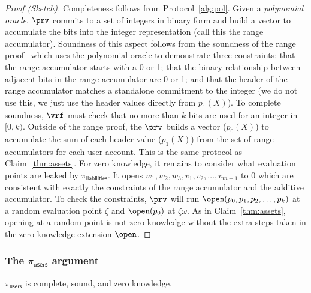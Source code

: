 \begin{proof}[Proof (Sketch)] Completeness follows from Protocol~\ref{alg:pol}. Given a \textit{polynomial oracle}, $\prv$ commits to a set of integers in binary form and build a vector to accumulate the bits into the integer representation (call this the range accumulator). Soundness of this aspect follows from the soundness of the range proof~\cite{rangeproof} which uses the polynomial oracle to demonstrate three constraints: that the range accumulator starts with a 0 or 1; that the binary relationship between adjacent bits in the range accumulator are 0 or 1; and that the header of the range accumulator matches a standalone commitment to the integer (we do not use this, we just use the header values directly from $p_1(X)$). To complete soundness, $\vrf$ must check that no more than $k$ bits are used for an integer in $[0,k)$. Outside of the range proof, the $\prv$ builds a vector ($p_0(X)$) to accumulate the sum of each header value ($p_1(X)$) from the set of range accumulators for each user account. This is the same protocol as Claim~\ref{thm:assets}. For zero knowledge, it remains to consider what evaluation points are leaked by $\pi_\mathsf{liabilities}$. It opens $w_1,w_2,w_3,v_1,v_2,\dots,v_{m-1}$ to 0 which are consistent with exactly the constraints of the range accumulator and the additive accumulator. To check the constraints, $\prv$ will run $\open(p_0,p_1,p_2,\dots,p_k)$ at a random evaluation point $\zeta$ and $\open(p_0)$ at $\zeta\omega$. As in Claim~\ref{thm:assets}, opening  at a random point is not zero-knowledge without the extra steps taken in the zero-knowledge extension $\open$.\end{proof}






\subsubsection{The $\pi_\mathsf{users}$ argument}

\begin{claim}\label{thm:users} $\pi_\mathsf{users}$ is complete, sound, and zero knowledge. \end{claim}

